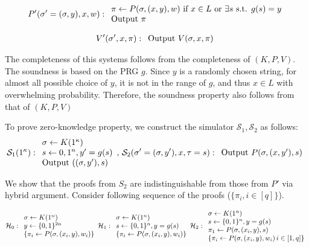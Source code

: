 \[ P'(\sigma'=(\sigma, y), x, w): 
\begin{array}{l l} 
\pi \leftarrow P(\sigma, (x,y), w)\text{ if }x \in L \text{ or } \exists s\text{ s.t. } g(s)=y \\
\text{Output }\pi \\
\end{array} \]

\[ V'(\sigma', x, \pi): 
\begin{array}{l l} 
\text{Output } V(\sigma, x, \pi)
\end{array} \]

The completeness of this systems follows from the completeness of $(K, P, V)$. The soundness is based on the PRG $g$. Since $y$ is a randomly chosen string, for almost all possible choice of $y$, it is not in the range of $g$, and thus $x \in L$ with overwhelming probability. Therefore, the soundness property also follows from that of $(K,P,V)$

To prove zero-knowledge property, we construct the simulator $\mathcal{S}_1, \mathcal{S}_2$ as follows:
\[ \mathcal{S}_1(1^\kappa): 
\begin{array}{l l} 
\sigma \leftarrow K(1^\kappa) \\
s \leftarrow {0,1}^{n}, y' = g(s) \\
\text{Output } ((\sigma, y'), s)
\end{array}
\text{, }
\mathcal{S}_2(\sigma'=(\sigma, y'), x, \tau=s): 
\begin{array}{l l} 
\text{Output } P(\sigma, (x,y'), s) \\
\end{array} \]

We show that the proofs from $S_2$ are indistinguishable from those from $P'$ via hybrid argument. Consider following sequence of the proofs ($\{\pi_i, i \in [q]\}$).

\[ 
\mathcal{H}_0: 
\begin{array}{l l} 
\sigma \leftarrow K(1^n) \\
y \leftarrow \{0,1\}^{2n} \\
\{\pi_i \leftarrow P(\sigma, (x_i, y), w_i)\}
\end{array} 
\mathcal{H}_1: 
\begin{array}{l l} 
\sigma \leftarrow K(1^n) \\
s \leftarrow \{0,1\}^{n},  y = g(s) \\
\{\pi_i \leftarrow P(\sigma, (x_i, y), w_i)\}
\end{array} 
\mathcal{H}_2: 
\begin{array}{l l} 
\sigma \leftarrow K(1^n) \\
s \leftarrow \{0,1\}^{n},  y = g(s) \\
\pi_1 \leftarrow P(\sigma, (x_i, y), s) \\
\{\pi_i \leftarrow P(\sigma, (x_i, y), w_i)\, i \in [1,q]\}
\end{array} 
\]

